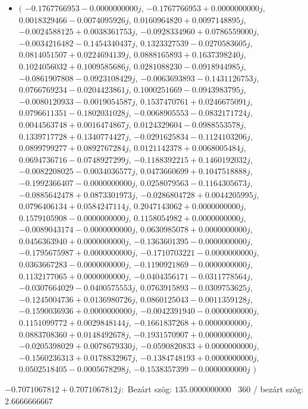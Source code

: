 \documentclass[14pt,a4paper]{article}
\begin{document}
\begin{itemize}
\item
$\big($
$-0.1767766953-0.0000000000j$, $-0.1767766953+0.0000000000j$, $0.0018329466-0.0074095926j$, $0.0160964820+0.0097148895j$, $-0.0024588125+0.0038361753j$, $-0.0928334960+0.0786559000j$, $-0.0034216482-0.1454340437j$, $0.1323327539-0.0270583605j$, $0.0814051507+0.0224694139j$, $0.0888165893+0.1637398240j$, $0.1024056032+0.1009585686j$, $0.0281088230-0.0918944985j$, $-0.0861907808-0.0923108429j$, $-0.0063693893-0.1431126753j$, $0.0766769234-0.0204423861j$, $0.1000251669-0.0943983795j$, $-0.0080120933-0.0019054587j$, $0.1537470761+0.0246675091j$, $0.0796611351-0.1802031028j$, $-0.0068905553-0.0832171724j$, $0.0044563748+0.0016474867j$, $0.0124329604-0.0988553578j$, $0.1339717728+0.1340774427j$, $-0.0291625834-0.1124103206j$, $0.0899799277+0.0892767284j$, $0.0121142378+0.0068005484j$, $0.0694736716-0.0748927299j$, $-0.1188392215+0.1460192032j$, $-0.0082208025-0.0034036577j$, $0.0473660699+0.1047518888j$, $-0.1992366407-0.0000000000j$, $0.0258079563-0.1164305673j$, $-0.0885642478+0.0873301973j$, $-0.0286804728+0.0044205995j$, $0.0796406134+0.0584247114j$, $0.2047143062+0.0000000000j$, $0.1579105908-0.0000000000j$, $0.1158054982+0.0000000000j$, $-0.0089043174-0.0000000000j$, $0.0630985078+0.0000000000j$, $0.0456363940+0.0000000000j$, $-0.1363601395-0.0000000000j$, $-0.1795675987+0.0000000000j$, $-0.1710703221-0.0000000000j$, $0.0363667283-0.0000000000j$, $-0.1190921869-0.0000000000j$, $0.1132177065+0.0000000000j$, $-0.0404356171-0.0311778564j$, $-0.0307664029-0.0400575553j$, $0.0763915893-0.0309753625j$, $-0.1245004736+0.0136980726j$, $0.0860125043-0.0011359128j$, $-0.1590036936+0.0000000000j$, $-0.0042391940-0.0000000000j$, $0.1151099772+0.0029848144j$, $-0.1661837268+0.0000000000j$, $0.0883708360+0.0148492678j$, $-0.1931570907+0.0000000000j$, $-0.0205398029+0.0078679330j$, $-0.0590820833+0.0000000000j$, $-0.1560236313+0.0178832967j$, $-0.1384748193+0.0000000000j$, $0.0502518405-0.0005678298j$, $-0.1538357399-0.0000000000j$
$\big)$
\end{itemize}
$-0.7071067812+0.7071067812j$:\
Bezárt szög: $135.0000000000$ \
360 / bezárt szög: $2.6666666667$\
\end{document}
